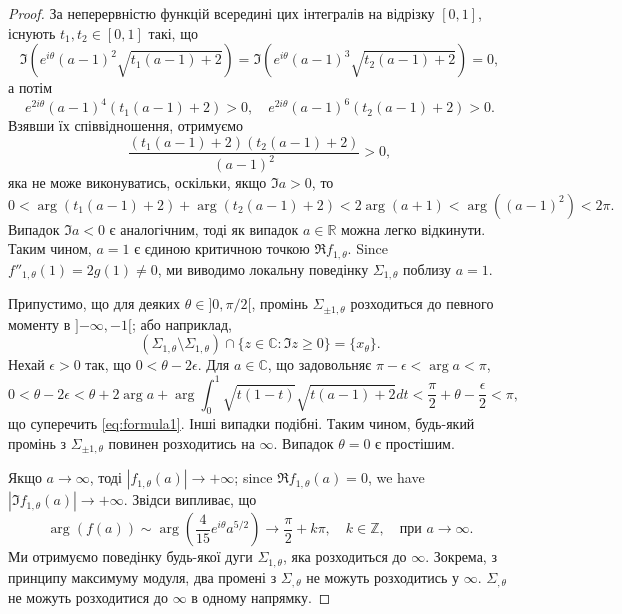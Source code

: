 \documentclass[]{article}
\theoremstyle{plain}
\begin{document}
\begin{proof}
За неперервністю функцій всередині цих інтегралів на відрізку $[0, 1]$, існують $t_1, t_2 \in [0, 1]$ такі, що
\[ \Im \left( e^{i\theta} (a - 1)^2 \sqrt{t_1(a - 1) + 2} \right) = \Im \left( e^{i\theta} (a - 1)^3 \sqrt{t_2(a - 1) + 2} \right) = 0, \]
а потім
\[ e^{2i\theta} (a - 1)^4 (t_1(a - 1) + 2) > 0, \quad e^{2i\theta} (a - 1)^6 (t_2(a - 1) + 2) > 0. \]
Взявши їх співвідношення, отримуємо
\[ \frac{(t_1(a - 1) + 2)(t_2(a - 1) + 2)}{(a - 1)^2} > 0, \]
яка не може виконуватись, оскільки, якщо $\Im a > 0$, то
\[ 0 < \arg(t_1(a - 1) + 2) + \arg(t_2(a - 1) + 2) < 2 \arg(a + 1) < \arg((a - 1)^2) < 2\pi. \]
Випадок $\Im a < 0$ є аналогічним, тоді як випадок $a \in \mathbb{R}$ можна легко відкинути. Таким чином, $a = 1$ є єдиною критичною точкою $\Re f_{1,\theta}$. Since $f''_{1,\theta}(1) = 2g(1) \neq 0$, ми виводимо локальну поведінку $\Sigma_{1,\theta}$ поблизу $a = 1$.

Припустимо, що для деяких $\theta \in ]0, \pi/2[$, промінь $\Sigma_{\pm 1,\theta}$ розходиться до певного моменту в $]{-\infty}, -1[$; або наприклад,
\[ (\Sigma_{1,\theta} \setminus \Sigma_{1,\theta}) \cap \{ z \in \mathbb{C} : \Im z \geq 0 \} = \{x_{\theta}\}. \]
Нехай $\epsilon > 0$ так, що $0 < \theta - 2\epsilon$. Для $a \in \mathbb{C}$, що задовольняє $\pi - \epsilon < \arg a < \pi$,
\[ 0 < \theta - 2\epsilon < \theta + 2 \arg a + \arg \int_{0}^{1} \sqrt{t(1 - t)} \sqrt{t(a - 1) + 2} dt < \frac{\pi}{2} + \theta - \frac{\epsilon}{2} < \pi, \]
що суперечить \eqref{eq:formula1}. Інші випадки подібні. Таким чином, будь-який промінь з $\Sigma_{\pm 1,\theta}$ повинен розходитись на $\infty$. Випадок $\theta = 0$ є простішим.

Якщо $a \to \infty$, тоді $|f_{1,\theta}(a)| \to +\infty$; since $\Re f_{1,\theta}(a) = 0$, we have $|\Im f_{1,\theta}(a)| \to +\infty$. Звідси випливає, що
\[ \arg(f(a)) \sim \arg \left( \frac{4}{15} e^{i\theta} a^{5/2} \right) \to \frac{\pi}{2} + k\pi, \quad k \in \mathbb{Z}, \quad \text{при } a \to \infty. \]
Ми отримуємо поведінку будь-якої дуги $\Sigma_{1,\theta}$, яка розходиться до $\infty$. Зокрема, з принципу максимуму модуля, два промені з $\Sigma_{,\theta}$ не можуть розходитись у $\infty$. $\Sigma_{,\theta}$ не можуть розходитися до $\infty$ в одному напрямку. 


\end{proof}
\end{document}
